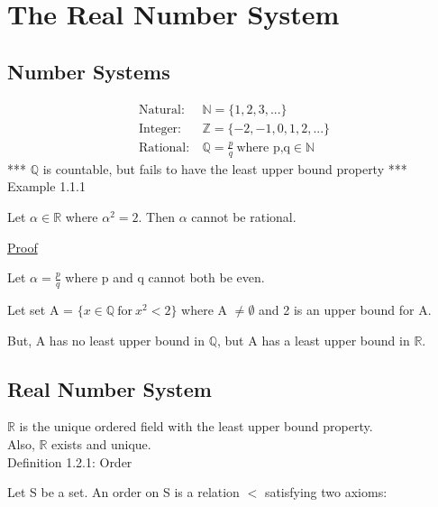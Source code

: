 \newpage
\section[Day 1: The Real Number System]{The Real Number System}





\subsection{Number Systems}

\begin{align*}
	\text{Natural}:\ & \mathbb{N} = \{1, 2, 3, ... \} \\	
	\text{Integer}:\ & \mathbb{Z} = \{-2, -1, 0, 1, 2, ... \} \\
	\text{Rational}:\ & \mathbb{Q} = \frac{p}{q} \ \text{where p,q} \in \mathbb{N}
\end{align*}
*** $\mathbb{Q}$ is countable, but fails to have the least upper bound property *** \\

{ \color{purple} Example 1.1.1 }

	\qquad Let $ \alpha \in \mathbb{R} $ where $ \alpha^2 = 2 $.
	Then $ \alpha $ cannot be rational.

{ \color{magenta} \underline{Proof} }

	Let $ \alpha = \frac{p}{q} $ where p and q cannot both be even.

	Let set A = $\{ x \in \mathbb{Q} \ \text{for} \ x^2 < 2 \} $ where A $ \neq \emptyset $
	and 2 is an upper bound for A.

	But, A has no least upper bound in $ \mathbb{Q} $,
	but A has a least upper bound in $ \mathbb{R} $.





\subsection{Real Number System}

	$ \mathbb{R} $ is the unique ordered field with the least upper bound property. \\
	Also, $ \mathbb{R} $ exists and unique. \\

{ \color{blue} Definition 1.2.1: Order }

	\qquad Let S be a set. An order on S is a relation $<$ satisfying two axioms:

